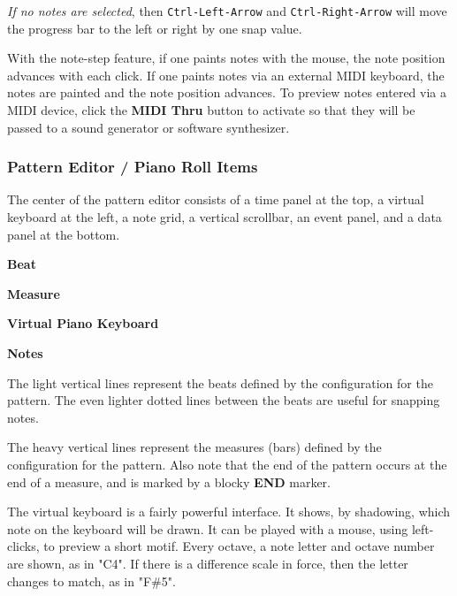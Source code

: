    \textsl{If no notes are selected}, then \texttt{Ctrl-Left-Arrow}
   and \texttt{Ctrl-Right-Arrow} will move the progress bar to the left or
   right by one snap value.

   With the note-step feature, if one paints notes with the mouse,
   the note position advances with each click.
   If one paints notes via an external MIDI keyboard, the notes are painted and
   the note position advances.
   To preview notes entered via a MIDI device, click the
   \textbf{MIDI Thru} button to activate so that they will be
   passed to a sound generator or software synthesizer.

\subsubsection{Pattern Editor / Piano Roll Items}
\label{subsubsec:pattern_editor_piano_roll_items}

   The center of the pattern editor consists of a time panel at the top,
   a virtual keyboard at the left, a note grid, a vertical scrollbar, an event
   panel, and a data panel at the bottom.

   \begin{enumber}
      \item \textbf{Beat}
      \item \textbf{Measure}
      \item \textbf{Virtual Piano Keyboard}
      \item \textbf{Notes}
   \end{enumber}

   \setcounter{ItemCounter}{0}      %

   The light vertical lines represent the beats defined by the configuration
   for the pattern.  The even lighter dotted lines between the beats are useful
   for snapping notes.

   The heavy vertical lines represent the measures (bars) defined by the
   configuration for the pattern.
   Also note that the end of the pattern
   occurs at the end of a measure, and is marked by a blocky \textbf{END}
   marker.

   The virtual keyboard is a fairly powerful interface.  It shows,
   by shadowing, which note on the keyboard will be drawn. It can be
   played with a mouse, using left-clicks, to preview a short motif.
   Every octave, a note letter and octave number are shown, as in
   "C4".  If there is a difference scale in force, then the letter changes to
   match, as in "F\#5".

